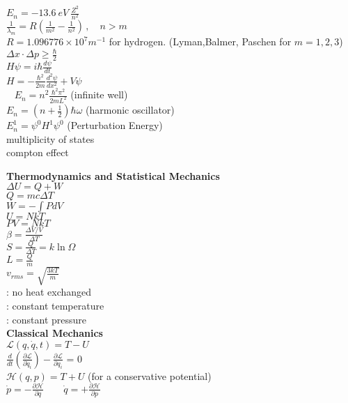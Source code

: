 \documentclass[12pt]{article}
\begin{document}
\begin{twocolumn}
\begin{flushleft}
\medskip
$\displaystyle  E_n = -13.6~eV~\frac{Z^2}{n^2}$ \\
\medskip
$\displaystyle \frac{1}{\lambda_m}=R\left( \frac{1}{m^2} - \frac{1}{n^2}\right) \, , \quad n>m $\\
$R=1.096776\times 10^7 m^{-1}$ for hydrogen. (Lyman,Balmer, Paschen for  $m=1,2,3$)
\medskip
$\displaystyle \Delta x \cdot \Delta  p \geq \frac{\hbar}{2} $ \\
\medskip
$\displaystyle H \psi=i \hbar \frac{d\psi}{dt} $ \\
\medskip
$\displaystyle H=-\frac{\hbar^2}{2m}\frac{d^2 \psi}{dx^2}+V\psi $\\\
\medskip
$\displaystyle E_n=n^2 \frac{\hbar^2 \pi^2}{2mL^2} $  (infinite well)\\ 
\medskip
$\displaystyle E_n=\left(n+\frac{1}{2} \right) \hbar \omega $ (harmonic oscillator)\\ 
\medskip
$\displaystyle E_n^1= \psi^0 H^1 \psi^0 $ (Perturbation Energy)\\
\medskip
multiplicity of states \\
\medskip
compton effect

\newpage
{\bf Thermodynamics and Statistical Mechanics} \\
\bigskip
$\displaystyle \Delta U = Q + W$\\ 
\medskip
$\displaystyle Q=mc\Delta T$\\
\medskip
$W=-\int P dV$\\
\medskip
$U=NkT$\\
\medskip
$PV=NkT$\\
\medskip
$\displaystyle \beta = \frac{\Delta V/V}{\Delta T}$\\
\medskip
$\displaystyle S = \frac{Q}{\Delta T} = k \ln \Omega$\\
\medskip
$\displaystyle L = \frac{Q}{m}$\\
\medskip
$\displaystyle v_{rms} = \sqrt{\frac{3 k T}{m}} $ \\
\medskip
{}: no heat exchanged\\
: constant temperature\\
: constant pressure\\

\bigskip
{\bf Classical Mechanics} \\
\bigskip
$\displaystyle \mathcal{L}(q,\dot{q},t)  = T - U$ \\
\medskip
$\displaystyle \frac{d}{dt}\left(\frac{\partial \mathcal{L}}{\partial \dot{q}_{i}}\right) - \frac{\partial \mathcal{L}}{\partial q_{i}}$ = 0 \\
\medskip
$\displaystyle \mathcal{H}(q,p) = T + U$ (for a conservative potential) \\
\medskip
$\displaystyle \dot{p} = -\frac{\partial \mathcal{H}}{\partial q} \qquad
\dot{q} = +\frac{\partial \mathcal{H}}{\partial p}$
\bigskip


\end{flushleft}
\end{twocolumn}
\end{document}
